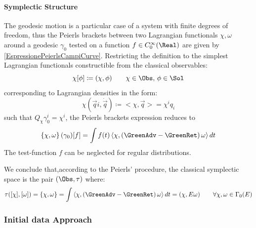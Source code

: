 \documentclass[Main]{subfiles}
\begin{document}
			\paragraph{Symplectic Structure}
				The geodesic motion is a particular case of a system with finite degrees of freedom, thus the Peierls brackets between two Lagrangian functionals $\chi, \omega$ around a geodesic $\gamma_0$ tested on a function $f \in C_0^\infty(\Real)$ are given by \ref{EspressionePeierlsCampiCurve}.
				Restricting the definition to the simplest Lagrangian functionals constructible from the classical observables:
				\begin{displaymath}
					\chi [\phi] \coloneqq (\chi, \phi) \qquad \chi \in \Obs,\, \phi \in \Sol
				\end{displaymath}
				corresponding to Lagrangian densities in the form:
				\begin{displaymath}
					\chi ( \vec{q}i, \dot{\vec{q}}) \coloneqq < \chi, \vec{q}> = \chi^i q_i
				\end{displaymath}
				such that $ Q_\chi \gamma_0^i = \chi^i$, the Peierls brackets expression reduces to
				\begin{displaymath}
					\left\lbrace\chi , \omega \right\rbrace (\gamma_0) [f] = \int f(t) \left\langle\chi, \left(\GreenAdv - \GreenRet \right)\omega \right\rangle dt
				\end{displaymath}
				The test-function $f$ can be neglected for regular distributions.

				\vspace{3.5mm}
				We conclude that,according to the Peierls' procedure,  the classical symplectic space is the pair $(\Obs, \tau)$ where:
				\begin{displaymath}
					\tau( [\chi], [\omega]) = \{\chi , \omega \} =\int \left\langle\chi, \left(\GreenAdv - \GreenRet \right)\omega \right\rangle dt = ( \chi, E \omega) \qquad \forall \chi,\omega \in \Gamma_0(E)
				\end{displaymath}
				
				
		\subsubsection{Initial data Approach}
\end{document}
